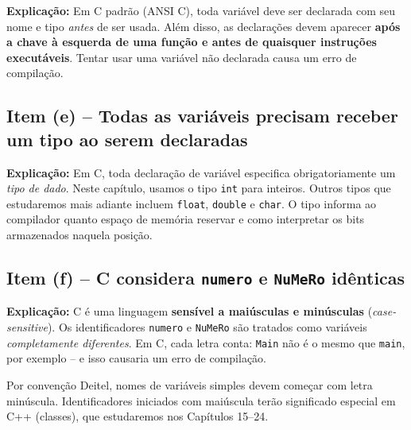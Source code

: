 \documentclass[12pt,a4paper]{article}
\begin{document}
\begin{tcolorbox}[colback=green!5,colframe=deitelgreen,title={\bfseries VERDADEIRO}]
\textbf{Explicação:} Em C padrão (ANSI C), toda variável deve ser declarada com seu nome
e tipo \textit{antes} de ser usada. Além disso, as declarações devem aparecer
\textbf{após a chave à esquerda de uma função e antes de quaisquer instruções executáveis}.
Tentar usar uma variável não declarada causa um erro de compilação.
\end{tcolorbox}

\subsection*{Item (e) -- Todas as variáveis precisam receber um tipo ao serem declaradas}

\begin{tcolorbox}[colback=green!5,colframe=deitelgreen,title={\bfseries VERDADEIRO}]
\textbf{Explicação:} Em C, toda declaração de variável especifica obrigatoriamente um
\textit{tipo de dado}. Neste capítulo, usamos o tipo \texttt{int} para inteiros.
Outros tipos que estudaremos mais adiante incluem \texttt{float}, \texttt{double} e
\texttt{char}. O tipo informa ao compilador quanto espaço de memória reservar e como
interpretar os bits armazenados naquela posição.
\end{tcolorbox}

\subsection*{Item (f) -- C considera \texttt{numero} e \texttt{NuMeRo} idênticas}

\begin{tcolorbox}[colback=red!5,colframe=deitelred,title={\bfseries FALSO}]
\textbf{Explicação:} C é uma linguagem \textbf{sensível a maiúsculas e minúsculas}
(\textit{case-sensitive}). Os identificadores \texttt{numero} e \texttt{NuMeRo} são
tratados como variáveis \textit{completamente diferentes}. Em C, cada letra conta:
\texttt{Main} não é o mesmo que \texttt{main}, por exemplo -- e isso causaria um
erro de compilação.
\begin{boaprática}
  Por convenção Deitel, nomes de variáveis simples devem começar com
  letra minúscula. Identificadores iniciados com maiúscula terão significado
  especial em C++ (classes), que estudaremos nos Capítulos 15--24.
\end{boaprática}
\end{tcolorbox}
\end{document}
